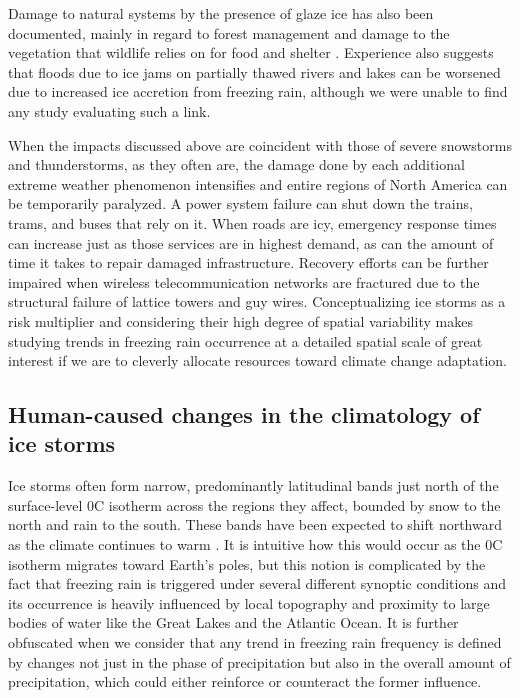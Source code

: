 \documentclass[twocol]{ametsoc}
\begin{document}
Damage to natural systems by the presence of glaze ice has also been documented, mainly in regard to forest management and damage to the vegetation that wildlife relies on for food and shelter \citep{pellikka2000modelling,proulx2001relationship}. Experience also suggests that floods due to ice jams on partially thawed rivers and lakes can be worsened due to increased ice accretion from freezing rain, although we were unable to find any study evaluating such a link. 

When the impacts discussed above are coincident with those of severe snowstorms and thunderstorms, as they often are, the damage done by each additional extreme weather phenomenon intensifies and entire regions of North America can be temporarily paralyzed. A power system failure can shut down the trains, trams, and buses that rely on it. When roads are icy, emergency response times can increase just as those services are in highest demand, as can the amount of time it takes to repair damaged infrastructure. Recovery efforts can be further impaired when wireless telecommunication networks are fractured due to the structural failure of lattice towers and guy wires. Conceptualizing ice storms as a risk multiplier and considering their high degree of spatial variability makes studying trends in freezing rain occurrence at a detailed spatial scale of great interest if we are to cleverly allocate resources toward climate change adaptation.

\subsection{Human-caused changes in the climatology of ice storms}
Ice storms often form narrow, predominantly latitudinal bands just north of the surface-level 0\degree C isotherm across the regions they affect, bounded by snow to the north and rain to the south. These bands have been expected to shift northward as the climate continues to warm \citep{cheng2011possible,lambert2011simulated}. It is intuitive how this would occur as the 0\degree C isotherm migrates toward Earth's poles, but this notion is complicated by the fact that freezing rain is triggered under several different synoptic conditions and its occurrence is heavily influenced by local topography and proximity to large bodies of water like the Great Lakes and the Atlantic Ocean. It is further obfuscated when we consider that any trend in freezing rain frequency is defined by changes not just in the phase of precipitation but also in the overall amount of precipitation, which could either reinforce or counteract the former influence. 
\end{document}
